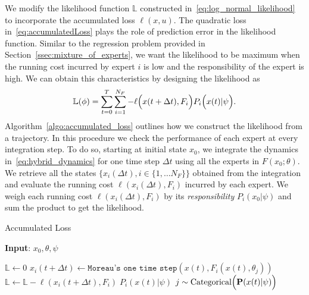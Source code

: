 \begin{enumerate}
    We modify the likelihood function $\mathbb{L}$ constructed
    in~\eqref{eq:log_normal_likelihood} to incorporate the accumulated loss
    $\ell(x, u)$.
    The quadratic loss in~\eqref{eq:accumulatedLoss} plays the role of prediction
    error in the likelihood function.
    Similar to the regression problem provided in
    Section~\ref{ssec:mixture_of_experts}, we want the likelihood to be maximum
    when the running cost incurred by expert $i$ is low and the responsibility
    of the expert is high.
    We can obtain this characteristics by designing the likelihood as
    \begin{align}
        \mathbb{L}(\phi) = \sum_{t=0}^{T} \sum_{i=1}^{N_F} - \ell \Bigl(x(t+\Delta t), F_i \Bigr) P_i\Bigl(x(t) | \psi \Bigr)  .
        \label{eq:accumulated_likelihood}
    \end{align}
    Algorithm~\ref{algo:accumulated_loss} outlines how we construct the
    likelihood from a trajectory.
    In this procedure we check the performance of each expert at every
    integration step.
    To do so, starting at initial state $x_0$, we integrate the dynamics
    in~\eqref{eq:hybrid_dynamics} for one time step $\Delta t$ using all the
    experts in $F(x_0;\theta)$.
    We retrieve all the states $\{ x_i(\Delta t) , i \in \{1, \dots N_F \}\}$
    obtained from the integration and evaluate the running cost $\ell(x_i(\Delta
    t), F_i)$ incurred by each expert.
    We weigh each running cost $\ell(x_i(\Delta t), F_i)$ by its
    \textit{responsibility} $P_i(x_0 | \psi)$ and sum the product to get the
    likelihood.
    \begin{algorithm}[H]
        \caption{Accumulated Loss}
        \label{algo:accumulated_loss}
        \small
        \hspace*{\algorithmicindent} \textbf{Input}: $x_0, \theta, \psi$
        \begin{algorithmic}[1]
            \State $\mathbb{L} \leftarrow 0$
                    \State $x_i(t+\Delta t) \leftarrow \texttt{Moreau's one time step}(x(t), F_i(x(t), \theta_j))$
                    \State $\mathbb{L} \leftarrow \mathbb{L} - \ell(x_i(t+\Delta t), F_i) \; P_i(x(t) | \psi)$
                \EndFor
                \State $j \sim \text{Categorical}\Bigl(\mathbf{P}(x(t)| \psi)\Bigr)$ 

\end{algorithmic}
\end{algorithm}
\end{enumerate}
